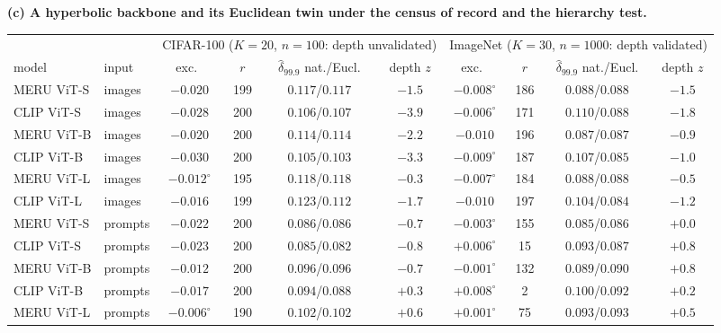 \begin{table}[H]\ContinuedFloat
\centering
\scriptsize
\setlength{\tabcolsep}{2.2pt}
\noindent\textbf{(c) A hyperbolic backbone and its Euclidean twin under the census of record and the hierarchy test.}\par\vspace{1.5pt}
\begin{tabular}{llcccc@{\hspace{8pt}}cccc}
\toprule
 & & \multicolumn{4}{c}{CIFAR-100 ($K{=}20$, $n{=}100$: depth unvalidated)} & \multicolumn{4}{c}{ImageNet ($K{=}30$, $n{=}1000$: depth validated)} \\
\cmidrule(lr){3-6}\cmidrule(lr){7-10}
model & input & exc.\ & $r$ & $\hat\delta_{99.9}$ nat./Eucl. & depth $z$ & exc.\ & $r$ & $\hat\delta_{99.9}$ nat./Eucl. & depth $z$ \\
\midrule
MERU ViT-S & images & $-0.020$ & 199 & $0.117$/$0.117$ & $-1.5$ & $-0.008^{\circ}$ & 186 & $0.088$/$0.088$ & $-1.5$ \\
CLIP ViT-S & images & $-0.028$ & 200 & $0.106$/$0.107$ & $-3.9$ & $-0.006^{\circ}$ & 171 & $0.110$/$0.088$ & $-1.8$ \\
MERU ViT-B & images & $-0.020$ & 200 & $0.114$/$0.114$ & $-2.2$ & $-0.010$ & 196 & $0.087$/$0.087$ & $-0.9$ \\
CLIP ViT-B & images & $-0.030$ & 200 & $0.105$/$0.103$ & $-3.3$ & $-0.009^{\circ}$ & 187 & $0.107$/$0.085$ & $-1.0$ \\
MERU ViT-L & images & $-0.012^{\circ}$ & 195 & $0.118$/$0.118$ & $-0.3$ & $-0.007^{\circ}$ & 184 & $0.088$/$0.088$ & $-0.5$ \\
CLIP ViT-L & images & $-0.016$ & 199 & $0.123$/$0.112$ & $-1.7$ & $-0.010$ & 197 & $0.104$/$0.084$ & $-1.2$ \\
\midrule
MERU ViT-S & prompts & $-0.022$ & 200 & $0.086$/$0.086$ & $-0.7$ & $-0.003^{\circ}$ & 155 & $0.085$/$0.086$ & $+0.0$ \\
CLIP ViT-S & prompts & $-0.023$ & 200 & $0.085$/$0.082$ & $-0.8$ & $+0.006^{\circ}$ & 15 & $0.093$/$0.087$ & $+0.8$ \\
MERU ViT-B & prompts & $-0.012$ & 200 & $0.096$/$0.096$ & $-0.7$ & $-0.001^{\circ}$ & 132 & $0.089$/$0.090$ & $+0.8$ \\
CLIP ViT-B & prompts & $-0.017$ & 200 & $0.094$/$0.088$ & $+0.3$ & $+0.008^{\circ}$ & 2 & $0.100$/$0.092$ & $+0.2$ \\
MERU ViT-L & prompts & $-0.006^{\circ}$ & 190 & $0.102$/$0.102$ & $+0.6$ & $+0.001^{\circ}$ & 75 & $0.093$/$0.093$ & $+0.5$ \\

\end{tabular}
\end{table}
